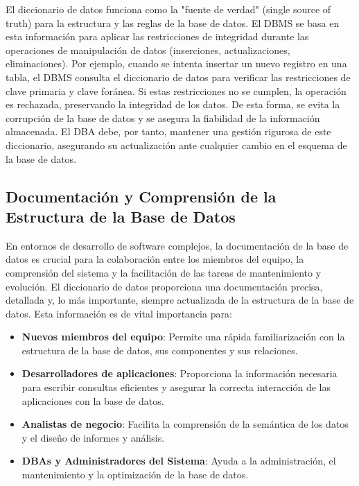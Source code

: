 El diccionario de datos funciona como la "fuente de verdad" (single source of truth) para la estructura y las reglas de la base de datos. El DBMS se basa en esta información para aplicar las restricciones de integridad durante las operaciones de manipulación de datos (inserciones, actualizaciones, eliminaciones).  Por ejemplo, cuando se intenta insertar un nuevo registro en una tabla, el DBMS consulta el diccionario de datos para verificar las restricciones de clave primaria y clave foránea. Si estas restricciones no se cumplen, la operación es rechazada, preservando la integridad de los datos. De esta forma, se evita la corrupción de la base de datos y se asegura la fiabilidad de la información almacenada.  El DBA debe, por tanto, mantener una gestión rigurosa de este diccionario, asegurando su actualización ante cualquier cambio en el esquema de la base de datos.

\subsection{Documentación y Comprensión de la Estructura de la Base de Datos}

En entornos de desarrollo de software complejos, la documentación de la base de datos es crucial para la colaboración entre los miembros del equipo, la comprensión del sistema y la facilitación de las tareas de mantenimiento y evolución. El diccionario de datos proporciona una documentación precisa, detallada y, lo más importante, siempre actualizada de la estructura de la base de datos.  Esta información es de vital importancia para:

\begin{itemize}
    \item \textbf{Nuevos miembros del equipo}:  Permite una rápida familiarización con la estructura de la base de datos, sus componentes y sus relaciones.
    \item \textbf{Desarrolladores de aplicaciones}:  Proporciona la información necesaria para escribir consultas eficientes y asegurar la correcta interacción de las aplicaciones con la base de datos.
    \item \textbf{Analistas de negocio}: Facilita la comprensión de la semántica de los datos y el diseño de informes y análisis.
    \item \textbf{DBAs y Administradores del Sistema}:  Ayuda a la administración, el mantenimiento y la optimización de la base de datos.
\end{itemize}

